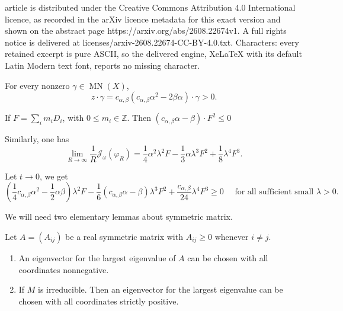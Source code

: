 \documentclass[10pt,a4paper]{amsart}
\def\Z{\mathbb{Z}}
\def\cJ{{\mathcal J}}
\newcommand{\MN}{\operatorname{MN}}
\newcommand{\cab}{c_{\alpha,\beta}}
\begin{document}
article is distributed under the Creative Commons Attribution 4.0 International licence, as recorded in the arXiv licence metadata for this exact version and shown on the abstract page https://arxiv.org/abs/2608.22674v1. A full rights notice is delivered at licenses/arxiv-2608.22674-CC-BY-4.0.txt. Characters: every retained excerpt is pure ASCII, so the delivered engine, XeLaTeX with its default Latin Modern text font, reports no missing character.
\begin{lemma}\label{lem:MN}
For every nonzero $\gamma\in\MN(X)$,
\[
 z\cdot \gamma=\cab(c_{\alpha,\beta}\alpha^2-2\beta\alpha)\cdot\gamma>0.
\]
\end{lemma}

\begin{lemma}\label{lem:seminegative-M}
    If $F=\sum_{i}m_iD_i$, with $0\leq m_i\in \Z$. Then $(c_{\alpha,\beta}\alpha-\beta)\cdot F^2\leq 0$
\end{lemma}

Similarly, one has\begin{equation}\label{eq:asymptotic-omega-slope-polynomial}
\lim_{R\rightarrow \infty}\frac{1}{R}\cJ_\omega(\varphi_R)=\frac{1}{4}\alpha^2\lambda^2F-\frac{1}{3}\alpha\lambda^3F^2+\frac{1}{8}\lambda^4F^3. 
\end{equation}

 Let $t\rightarrow 0$, we get \begin{equation}
     \label{eq:seminegative}
(\frac14c_{\alpha,\beta}\alpha^2-\frac12\alpha\beta)\lambda^2F
   -\frac16(c_{\alpha,\beta}\alpha-\beta) \lambda^3 F^2
   +\frac{c_{\alpha,\beta}}{24}\lambda^4F^3\ge0 \quad \text{ for all sufficient small }\lambda>0.
  \end{equation}

We will need two elementary lemmas about symmetric matrix. \begin{lemma}\label{lem:sign-matrix}
Let $A=(A_{ij})$ be a real symmetric matrix with
$A_{ij}\geq0$ whenever $i\neq j$.
\begin{enumerate}[label=\textup{(\roman*)}]
\item An eigenvector for the largest eigenvalue of $A$ can be chosen
      with all coordinates nonnegative.
\item If $M$ is irreducible.  Then an eigenvector
      for the largest eigenvalue can be chosen with all coordinates
      strictly positive.
\end{enumerate}
\end{lemma}
\end{document}
